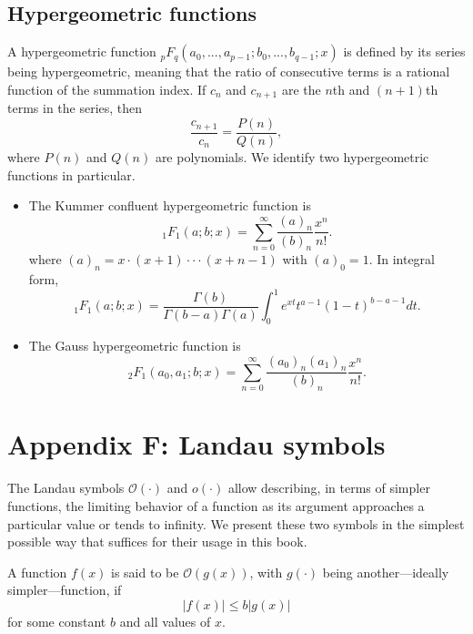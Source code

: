 \documentclass[a4paper, 12pt]{book}
\begin{document}
\section{Hypergeometric functions}
A hypergeometric function ${}_{p}F_{q}(a_{0},...,a_{p-1};b_{0},...,b_{q-1};x)$ is defined by its series being hypergeometric, meaning that the ratio of consecutive terms is a rational function of the summation index. If $c_{n}$ and $c_{n+1}$ are the $n$th and $(n+1)$th terms in the series, then
\begin{equation}
    \frac{c_{n+1}}{c_{n}}=\frac{P(n)}{Q(n)}, \tag{E.26}
\end{equation}
where $P(n)$ and $Q(n)$ are polynomials. We identify two hypergeometric functions in particular.
\begin{itemize}
    \item The Kummer confluent hypergeometric function is
    \begin{equation}
        {}_{1}F_{1}(a;b;x)=\sum_{n=0}^{\infty}\frac{(a)_{n}}{(b)_{n}}\frac{x^{n}}{n!}. \tag{E.27}
    \end{equation}
    where $(a)_{n}=x\cdot(x+1)\cdot\cdot\cdot(x+n-1)$ with $(a)_{0}=1$. In integral form,
    \begin{equation}
        {}_{1}F_{1}(a;b;x)=\frac{\Gamma(b)}{\Gamma(b-a)\Gamma(a)}\int_{0}^{1}e^{xt}t^{a-1}(1-t)^{b-a-1}dt. \tag{E.28}
    \end{equation}
    \item The Gauss hypergeometric function is
    \begin{equation}
        {}_{2}F_{1}(a_{0},a_{1};b;x)=\sum_{n=0}^{\infty}\frac{(a_{0})_{n}(a_{1})_{n}}{(b)_{n}}\frac{x^{n}}{n!}. \tag{E.29}
    \end{equation}
\end{itemize}

\setcounter{chapter}{6}
\setcounter{section}{0}
\chapter*{Appendix F: Landau symbols}

The Landau symbols $\mathcal{O}(\cdot)$ and $o(\cdot)$ allow describing, in terms of simpler functions, the limiting behavior of a function as its argument approaches a particular value or tends to infinity. We present these two symbols in the simplest possible way that suffices for their usage in this book.

A function $f(x)$ is said to be $\mathcal{O}(g(x))$, with $g(\cdot)$ being another—ideally simpler—function, if
\begin{equation}
    |f(x)|\le b|g(x)| \tag{F.1}
\end{equation}
for some constant $b$ and all values of $x$.
\end{document}
